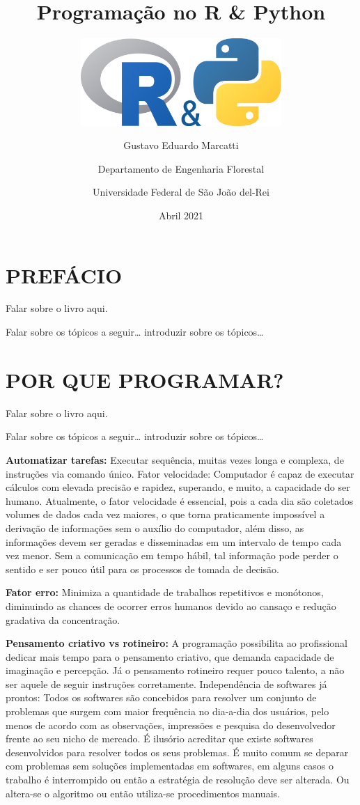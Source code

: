 \documentclass[
  11pt,
  a5paper,
  openany]{book}
\title{Programação no R \& Python}
\subtitle{\includegraphics[width=3in,height=\textheight]{images/logo.png}}
\author{Gustavo Eduardo Marcatti \and Departamento de Engenharia Florestal \and Universidade Federal de São João del-Rei}
\date{Abril 2021}
\begin{document}
\maketitle

{
\setcounter{tocdepth}{1}
\tableofcontents
}
\renewcommand{\figurename}{Figura}
\renewcommand{\tablename}{Tabela}
\renewcommand{\contentsname}{SUMÁRIO}

\hypertarget{prefuxe1cio}{%
\chapter{PREFÁCIO}\label{prefuxe1cio}}

Falar sobre o livro aqui.

Falar sobre os tópicos a seguir\ldots{} introduzir sobre os tópicos\ldots{}

\hypertarget{por-que-programar}{%
\chapter{POR QUE PROGRAMAR?}\label{por-que-programar}}

Falar sobre o livro aqui.

Falar sobre os tópicos a seguir\ldots{} introduzir sobre os tópicos\ldots{}

\textbf{Automatizar tarefas:} Executar sequência, muitas vezes longa e complexa, de instruções via comando único.
Fator velocidade: Computador é capaz de executar cálculos com elevada precisão e rapidez, superando, e muito, a capacidade do ser humano. Atualmente, o fator velocidade é essencial, pois a cada dia são coletados volumes de dados cada vez maiores, o que torna praticamente impossível a derivação de informações sem o auxílio do computador, além disso, as informações devem ser geradas e disseminadas em um intervalo de tempo cada vez menor. Sem a comunicação em tempo hábil, tal informação pode perder o sentido e ser pouco útil para os processos de tomada de decisão.

\textbf{Fator erro:} Minimiza a quantidade de trabalhos repetitivos e monótonos, diminuindo as chances de ocorrer erros humanos devido ao cansaço e redução gradativa da concentração.

\textbf{Pensamento criativo vs rotineiro:} A programação possibilita ao profissional dedicar mais tempo para o pensamento criativo, que demanda capacidade de imaginação e percepção. Já o pensamento rotineiro requer pouco talento, a não ser aquele de seguir instruções corretamente.
Independência de softwares já prontos: Todos os softwares são concebidos para resolver um conjunto de problemas que surgem com maior frequência no dia-a-dia dos usuários, pelo menos de acordo com as observações, impressões e pesquisa do desenvolvedor frente ao seu nicho de mercado. É ilusório acreditar que existe softwares desenvolvidos para resolver todos os seus problemas. É muito comum se deparar com problemas sem soluções implementadas em softwares, em alguns casos o trabalho é interrompido ou então a estratégia de resolução deve ser alterada. Ou altera-se o algoritmo ou então utiliza-se procedimentos manuais.
\end{document}
